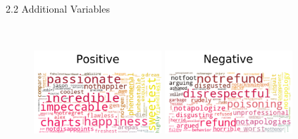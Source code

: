 \documentclass[10pt]{beamer}
\begin{document}
\begin{frame}{2.2 Additional Variables}
\begin{figure}[htbp]
\centering
\begin{minipage}[t]{0.5\textwidth}
\centering
\includegraphics[width=4.8cm,height=5cm]{../image/dist5.png}

\end{minipage}
\begin{minipage}[t]{0.48\textwidth}
\centering
\includegraphics[width=4.8cm,height=5cm]{../image/dist1.png}

\end{minipage}
\end{figure}
\end{frame}
\end{document}
